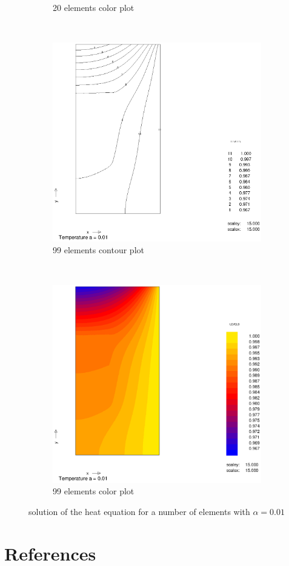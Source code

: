 \documentclass[10pt,a4paper]{article}
\begin{document}
\begin{figure}[h]
\begin{subfigure}[b]{0.45\textwidth}
                \caption{20 elements color plot}
                \label{fig:colplot_a001_50el}
        \end{subfigure}
        ~
        \begin{subfigure}[b]{0.45\textwidth}
                \includegraphics[width=\textwidth]{cont_a001_99el}
                \caption{99 elements contour plot}
                \label{fig:cont_a001_99el}
        \end{subfigure}
        ~ 
        \begin{subfigure}[b]{0.45\textwidth}
                \includegraphics[width=\textwidth]{colplot_a001_99el}
                \caption{99 elements color plot}
                \label{fig:colplot_a001_99el}
        \end{subfigure}
        \caption{solution of the heat equation for a number of elements with $\alpha = 0.01$} 
        \label{fig:10}                                
\end{figure}
\section{References}
\end{document}
